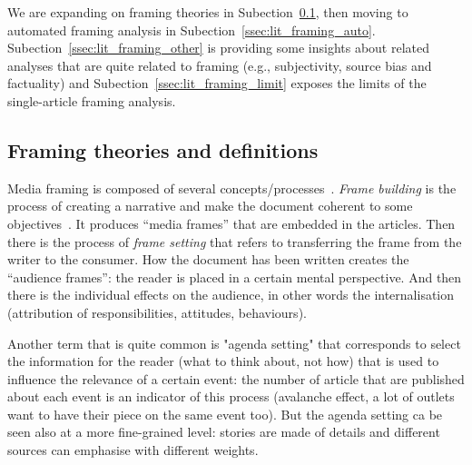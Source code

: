 We are expanding on framing theories in Subection~\ref{ssec:lit_framing_theory}, then moving to automated framing analysis in Subection~\ref{ssec:lit_framing_auto}. Subection~\ref{ssec:lit_framing_other} is providing some insights about related analyses that are quite related to framing (e.g., subjectivity, source bias and factuality) and Subection~\ref{ssec:lit_framing_limit} exposes the limits of the single-article framing analysis.

\subsection{Framing theories and definitions}
\label{ssec:lit_framing_theory}


Media framing is composed of several concepts/processes~\cite{scheufele1999framing}.
\textit{Frame building} is the process of creating a narrative and make the document coherent to some objectives~\cite{TODO}. It produces ``media frames'' that are embedded in the articles.
Then there is the process of \textit{frame setting} that refers to transferring the frame from the writer to the consumer. How the document has been written creates the ``audience frames'': the reader is placed in a certain mental perspective.
And then there is the individual effects on the audience, in other words the internalisation (attribution of responsibilities, attitudes, behaviours).

Another term that is quite common is "agenda setting" that corresponds to select the information for the reader (what to think about, not how) that is used to influence the relevance of a certain event: the number of article that are published about each event is an indicator of this process (avalanche effect, a lot of outlets want to have their piece on the same event too).
But the agenda setting ca be seen also at a more fine-grained level: stories are made of details and different sources can emphasise with different weights.


